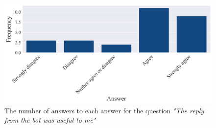 \begin{figure}[H]
    \centering
    \includegraphics[width=1\textwidth]{results/plots/assets/feedback-01-frequency-of-answer-for-question-d474ac.png}
    \caption{The number of answers to each answer for the question \textit{"The reply from the bot was useful to me"}}
    \label{fig:feedback_01_frequency_of_answer_for_question_d474ac}
\end{figure}